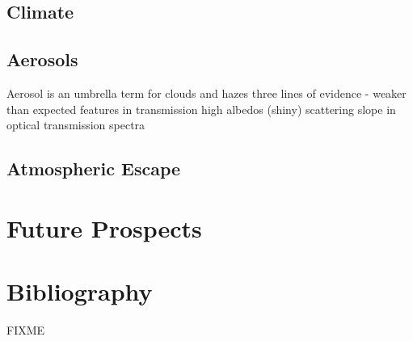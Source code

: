 \documentclass[graybox,natbib,nosecnum]{svmult}
\begin{document}
\subsection{Climate}

\subsection{Aerosols}
Aerosol is an umbrella term for clouds and hazes
three lines of evidence - weaker than expected features in transmission
high albedos (shiny)
scattering slope in optical transmission spectra

\subsection{Atmospheric Escape}


\section{Future Prospects}

\section{Bibliography}

\begin{acknowledgement}
FIXME
\end{acknowledgement}

\end{document}
